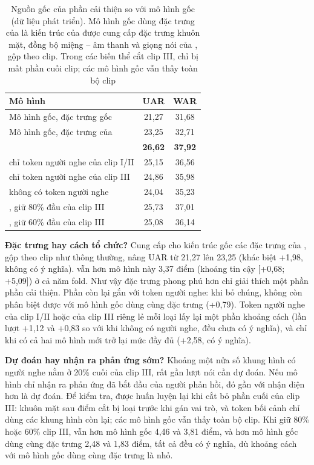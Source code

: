 \begin{table}[!htb]
\centering
\caption{Nguồn gốc của phần cải thiện so với mô hình gốc (dữ liệu phát triển). Mô hình gốc dùng đặc trưng của \model{} là kiến trúc của \citet{wang2026hief} được cung cấp đặc trưng khuôn mặt, đồng bộ miệng -- âm thanh và giọng nói của \model{}, gộp theo clip. Trong các biến thể cắt clip III, chỉ \model{} bị mất phần cuối clip; các mô hình gốc vẫn thấy toàn bộ clip}
\label{tab:origin}
\begin{tabular}{lcc}
\toprule
Mô hình & UAR & WAR \\
\midrule
Mô hình gốc, đặc trưng gốc & 21,27 & 31,68 \\
Mô hình gốc, đặc trưng của \model{} & 23,25 & 32,71 \\
\midrule
\model{} & \textbf{26,62} & \textbf{37,92} \\
\quad chỉ token người nghe của clip I/II & 25,15 & 36,56 \\
\quad chỉ token người nghe của clip III & 24,86 & 35,98 \\
\quad không có token người nghe & 24,04 & 35,23 \\
\midrule
\model{}, giữ 80\% đầu của clip III & 25,73 & 37,01 \\
\model{}, giữ 60\% đầu của clip III & 25,08 & 36,14 \\
\bottomrule
\end{tabular}
\end{table}

\textbf{Đặc trưng hay cách tổ chức?} Cung cấp cho kiến trúc gốc các đặc trưng của \model{}, gộp theo clip như thông thường, nâng UAR từ 21,27 lên 23,25 (khác biệt +1,98, không có ý nghĩa). \model{} vẫn hơn mô hình này 3,37 điểm (khoảng tin cậy [+0,68; +5,09]) ở cả năm fold. Như vậy đặc trưng phong phú hơn chỉ giải thích một phần phần cải thiện. Phần còn lại gắn với token người nghe: khi bỏ chúng, \model{} không còn phân biệt được với mô hình gốc dùng cùng đặc trưng (+0,79). Token người nghe của clip I/II hoặc của clip III riêng lẻ mỗi loại lấy lại một phần khoảng cách (lần lượt +1,12 và +0,83 so với khi không có người nghe, đều chưa có ý nghĩa), và chỉ khi có cả hai mô hình mới trở lại mức đầy đủ (+2,58, có ý nghĩa).

\textbf{Dự đoán hay nhận ra phản ứng sớm?} Khoảng một nửa số khung hình có người nghe nằm ở 20\% cuối của clip III, rất gần lượt nói cần dự đoán. Nếu mô hình chỉ nhận ra phản ứng đã bắt đầu của người phản hồi, đó gần với nhận diện hơn là dự đoán. Để kiểm tra, \model{} được huấn luyện lại khi cắt bỏ phần cuối của clip III: khuôn mặt sau điểm cắt bị loại trước khi gán vai trò, và token bối cảnh chỉ dùng các khung hình còn lại; các mô hình gốc vẫn thấy toàn bộ clip. Khi giữ 80\% hoặc 60\% clip III, \model{} vẫn hơn mô hình gốc 4,46 và 3,81 điểm, và hơn mô hình gốc dùng cùng đặc trưng 2,48 và 1,83 điểm, tất cả đều có ý nghĩa, dù khoảng cách với mô hình gốc dùng cùng đặc trưng là nhỏ.

